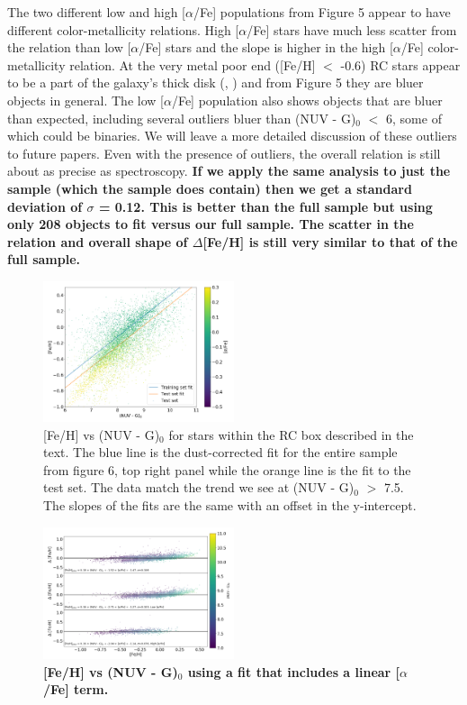 \documentclass[twocolumn]{emulateapj}
\begin{document}
The two different low and high [$\alpha$/Fe] populations from Figure 5 appear to have different color-metallicity relations. High [$\alpha$/Fe] stars have much less scatter from the relation than low [$\alpha$/Fe] stars and the slope is higher in the high [$\alpha$/Fe] color-metallicity relation. At the very metal poor end ([Fe/H] $<$ -0.6) RC stars appear to be a part of the galaxy's thick disk (\citealt{brook12}, \citealt{hawkins15}) and from Figure 5 they are bluer objects in general. The low [$\alpha$/Fe] population also shows objects that are bluer than expected, including several outliers bluer than (NUV - G)$_0$ $<$ 6, some of which could be binaries. We will leave a more detailed discussion of these outliers to future papers. Even with the presence of outliers, the overall relation is still about as precise as spectroscopy. \textbf{If we apply the same analysis to just the \citealt{bovy14} sample (which the \citealt{ting18} sample does contain) then we get a standard deviation of $\sigma$ = 0.12. This is better than the full sample but using only 208 objects to fit versus our full sample. The scatter in the relation and overall shape of $\Delta$[Fe/H] is still very similar to that of the full sample.}

\begin{figure}[] %
\centering
\includegraphics[width=0.5\textwidth]{f7.pdf}
\caption{[Fe/H] vs (NUV - G)$_0$ for stars within the RC box described in the text. The blue line is the dust-corrected fit for the entire sample from figure 6, top right panel while the orange line is the fit to the test set. The data match the trend we see at (NUV - G)$_0$ $>$ 7.5. The slopes of the fits are the same with an offset in the y-intercept.}
\end{figure}

\begin{figure}[] %
\centering
\includegraphics[width=0.5\textwidth]{f8.pdf}
\caption{\textbf{[Fe/H] vs (NUV - G)$_0$ using a fit that includes a linear [$\alpha$/Fe] term.}}
\end{figure}
\end{document}

